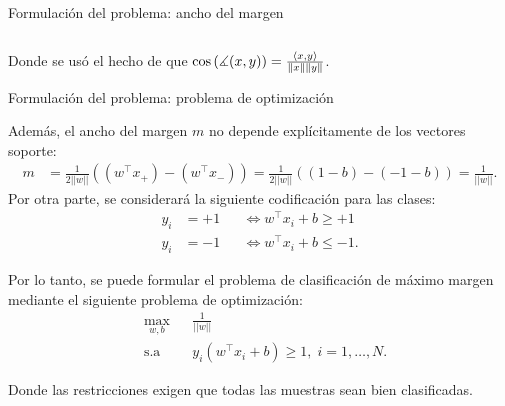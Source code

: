 \documentclass[handout, 9pt]{beamer}
\begin{document}
\begin{frame}{Formulación del problema: ancho del margen}
\begin{columns}
\begin{column}{0.55\textwidth}
\end{column}

\end{columns}

Donde se usó el hecho de que $\cos\left(\measuredangle(x,y)\right) = \frac{\langle x,y\rangle}{\left\lVert x\right\rVert\left\lVert y\right\rVert}$.
	
\end{frame}

\begin{frame}{Formulación del problema: problema de optimización}

Además, el ancho del margen $m$ no depende explícitamente de los vectores soporte:
\begin{align*}
    m &= \frac{1}{2||w||} \left( (w^\top x_{+}) - (w^\top x_{-})\right)
    = \frac{1}{2||w||} \left((1-b) - (-1-b)\right)
    = \frac{1}{||w||}.
\end{align*}\pause
Por otra parte, se considerará la siguiente codificación para las clases:
\begin{alignat*}{3}
    y_i&=+1 &&\Leftrightarrow w^\top x_i + b \geq +1 \\
    y_i &=-1 &&\Leftrightarrow w^\top x_i + b \leq -1.
 \end{alignat*}\pause
 
Por lo tanto, se puede formular el problema de clasificación de máximo margen mediante el siguiente problema de optimización:
\begin{equation*}
\begin{aligned}
& \underset{w,b}{\text{max}}
& & \frac{1}{||w||}\\
& \text{s.a}
& & y_i (w^\top x_i +b) \geq 1, \; i = 1, \ldots, N.
\end{aligned}
\end{equation*}

Donde las restricciones exigen que todas las muestras sean bien clasificadas.
	
\end{frame}
\end{document}
